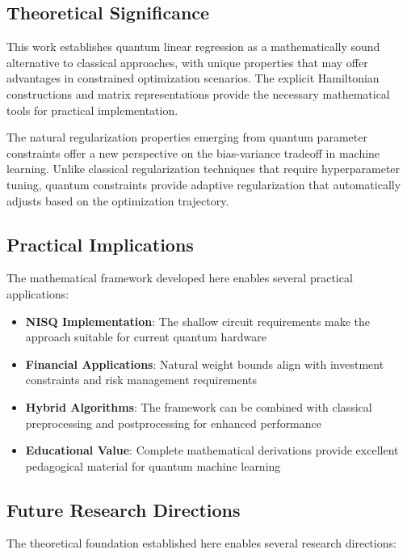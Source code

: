 \documentclass[11pt]{article}
\begin{document}
\subsection{Theoretical Significance}

This work establishes quantum linear regression as a mathematically sound alternative to classical approaches, with unique properties that may offer advantages in constrained optimization scenarios. The explicit Hamiltonian constructions and matrix representations provide the necessary mathematical tools for practical implementation.

The natural regularization properties emerging from quantum parameter constraints offer a new perspective on the bias-variance tradeoff in machine learning. Unlike classical regularization techniques that require hyperparameter tuning, quantum constraints provide adaptive regularization that automatically adjusts based on the optimization trajectory.

\subsection{Practical Implications}

The mathematical framework developed here enables several practical applications:

\begin{itemize}
\item \textbf{NISQ Implementation}: The shallow circuit requirements make the approach suitable for current quantum hardware
\item \textbf{Financial Applications}: Natural weight bounds align with investment constraints and risk management requirements
\item \textbf{Hybrid Algorithms}: The framework can be combined with classical preprocessing and postprocessing for enhanced performance
\item \textbf{Educational Value}: Complete mathematical derivations provide excellent pedagogical material for quantum machine learning
\end{itemize}

\subsection{Future Research Directions}

The theoretical foundation established here enables several research directions:
\end{document}
